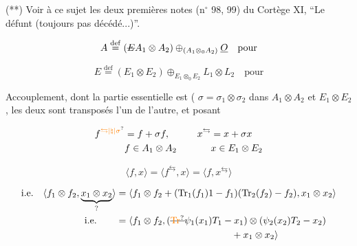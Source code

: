 (**) Voir à ce sujet les deux premières notes (n$^\circ$ 98, 99) du Cortège XI, ``Le défunt (toujours pas décédé...)''.


\[ A\overset{\mathrm{def}}{=}(\deleted{E}A_1\otimes A_2)\oplus_{(A_1\otimes_0 A_2)}\underline{O}\quad\text{pour} \]


\[ E\overset{\mathrm{def}}{=}(E_1\otimes E_2)\oplus_{E_1\otimes_0 E_2}L_1\otimes L_2\quad\text{pour} \]


Accouplement,  dont la partie essentielle est  (  $\sigma=\sigma_1\otimes\sigma_2$ dans $A_1\otimes A_2$ et $E_1\otimes E_2$, les deux sont transposés l'un de l'autre, et posant

\[
\begin{aligned}
 f^{\unsure{\leftrightarrows|\natural|\sigma}}&=f+\sigma f,\qquad &x^{\leftrightarrows}&=x+\sigma x\\
 &f\in A_1\otimes A_2 &&x\in E_1\otimes E_2
\end{aligned}
\]


\[ \langle f,x\rangle=\langle f^{\leftrightarrows},x\rangle=\langle f,x^{\leftrightarrows}\rangle \]

\[
\begin{aligned}
\text{i.e.}\quad\langle f_1\otimes f_2,\underbrace{x_1\otimes x_2}_{?}\rangle
 &=\langle f_1\otimes f_2+(\mathrm{Tr}_1(f_1)1-f_1)(\mathrm{Tr}_{2}(f_2)-f_2),x_1\otimes x_2\rangle\\
\text{i.e.}\qquad
 &=\langle f_1\otimes f_2,(\deleted{\unsure{\mathrm{Tr}}}\psi_1(x_1)T_1-x_1)\otimes(\psi_2(x_2)T_2-x_2)\\
 &\hspace{12em}+x_1\otimes x_2\rangle
\end{aligned}
\]

